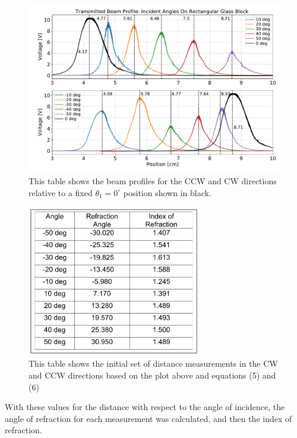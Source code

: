 \documentclass[colorlinks=true,pdfstartview=FitV,linkcolor=blue,
            citecolor=red,urlcolor=magenta]{basedoc}
\begin{document}
    \begin{figure}[!h]
      \begin{center}
      \includegraphics[width=5.5in]{resources/Transmitted_Beam_Profiles.pdf}
      \caption{This table shows the beam profiles for the CCW and CW directions relative to a fixed $\theta_1 = 0^{\circ}$ position shown in black.}
      \label{fig:partB_plot}
      \end{center}
    \end{figure}

    \begin{figure}[!h]
      \begin{center}
      \includegraphics[width=3in]{resources/partB_data_table.png}
      \caption{This table shows the initial set of distance measurements in the CW and CCW directions based on the plot above and equations (5) and (6)}
      \label{fig:partB_data_table}
      \end{center}
    \end{figure}

  With these values for the distance with respect to the angle of incidence, the angle of refraction for each measurement was calculated, and then the index of refraction.
\end{document}
